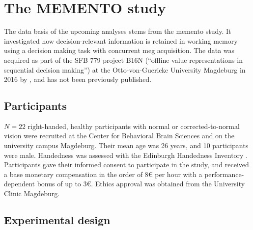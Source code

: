 \section{The MEMENTO study}


The data basis of the upcoming analyses stems from the memento study.
It investigated how decision-relevant information is retained in working memory using a decision making task with concurrent \gls{meg} acquisition.
The data was acquired as part of the SFB 779 project B16N (``offline value representations in sequential decision making'') at the Otto-von-Guericke University Magdeburg in 2016 by \citet{kaiser}, and has not been previously published.


\subsection{Participants}

$N = 22$ right-handed, healthy participants with normal or corrected-to-normal vision were recruited at the Center for Behavioral Brain Sciences and on the university campus Magdeburg.
Their mean age was 26 years, and 10 participants were male.
Handedness was assessed with the Edinburgh Handedness Inventory \citep{oldfield1971assessment}.
Participants gave their informed consent to participate in the study, and received a base monetary compensation in the order of 8€ per hour with a performance-dependent bonus of up to 3€.
Ethics approval was obtained from the University Clinic Magdeburg.

\subsection{Experimental design}


